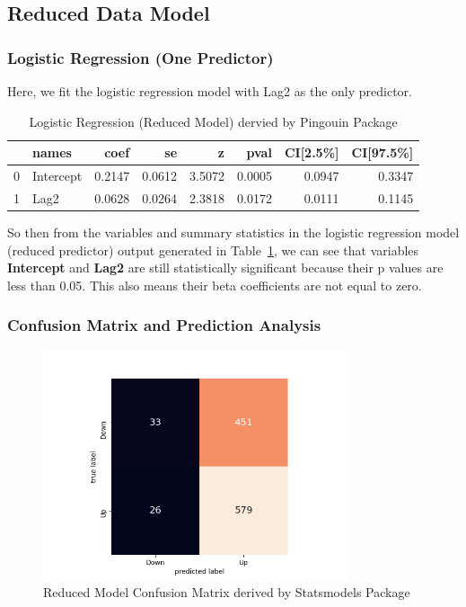 \documentclass[12pt]{article}
\begin{document}
\subsection{Reduced Data Model}
\subsubsection{Logistic Regression (One Predictor)}
Here, we fit the logistic regression model with Lag2 as the only predictor. 

\begin{table}[h!]
\centering
\begin{tabular}{llrrrrrr}
\hline
 &      names &    coef &      se &       z &    pval &  CI[2.5\%] &  CI[97.5\%] \\
\hline
0 &  Intercept &  0.2147 &  0.0612 &  3.5072 &  0.0005 &    0.0947 &     0.3347 \\
1 &       Lag2 &  0.0628 &  0.0264 &  2.3818 &  0.0172 &    0.0111 &     0.1145 \\
\hline
\end{tabular}
\caption{Logistic Regression (Reduced Model) dervied by Pingouin Package}
\label{table_6}
\end{table}

So then from the variables and summary statistics in the logistic regression model (reduced predictor) output generated in Table~\ref{table_6}, we can see that variables \textbf{Intercept} and \textbf{Lag2} are still statistically significant because their p values are less than 0.05. This also means their beta coefficients are not equal to zero.


\subsubsection{Confusion Matrix and Prediction Analysis}

\begin{figure}[!htbp]
	\centering
	\includegraphics[width=9cm]{onemodel.png}
	\caption{Reduced Model Confusion Matrix derived by Statsmodels Package}
\label{fig_4}
\end{figure}
\end{document}
